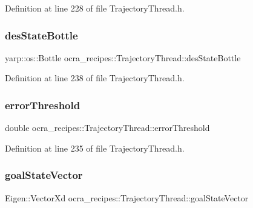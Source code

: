 Definition at line 228 of file Trajectory\+Thread.\+h.

\hypertarget{classocra__recipes_1_1TrajectoryThread_aae66d09e0f64c124428cebcdb53bdf33}{}\label{classocra__recipes_1_1TrajectoryThread_aae66d09e0f64c124428cebcdb53bdf33} 
\subsubsection{\texorpdfstring{des\+State\+Bottle}{desStateBottle}}
{\footnotesize\ttfamily yarp\+::os\+::\+Bottle ocra\+\_\+recipes\+::\+Trajectory\+Thread\+::des\+State\+Bottle\hspace{0.3cm}{\ttfamily [protected]}}



Definition at line 238 of file Trajectory\+Thread.\+h.

\hypertarget{classocra__recipes_1_1TrajectoryThread_a69ca8ea525dd7529fbeae6d8bb9529b3}{}\label{classocra__recipes_1_1TrajectoryThread_a69ca8ea525dd7529fbeae6d8bb9529b3} 
\subsubsection{\texorpdfstring{error\+Threshold}{errorThreshold}}
{\footnotesize\ttfamily double ocra\+\_\+recipes\+::\+Trajectory\+Thread\+::error\+Threshold\hspace{0.3cm}{\ttfamily [protected]}}



Definition at line 235 of file Trajectory\+Thread.\+h.

\hypertarget{classocra__recipes_1_1TrajectoryThread_abb9ba9fef74e7336a325ad1183f4e090}{}\label{classocra__recipes_1_1TrajectoryThread_abb9ba9fef74e7336a325ad1183f4e090} 
\subsubsection{\texorpdfstring{goal\+State\+Vector}{goalStateVector}}
{\footnotesize\ttfamily Eigen\+::\+Vector\+Xd ocra\+\_\+recipes\+::\+Trajectory\+Thread\+::goal\+State\+Vector\hspace{0.3cm}{\ttfamily [protected]}}



